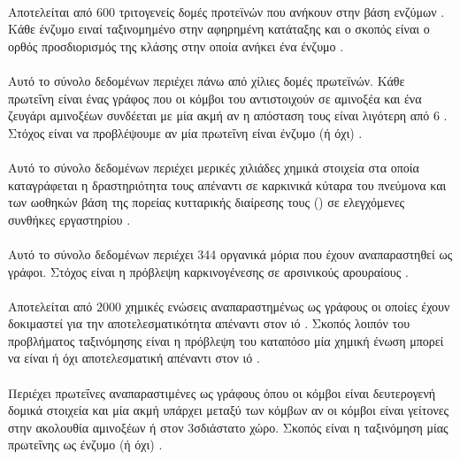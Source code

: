 \paragraph*{} Αποτελείται από $600$ τριτογενείς δομές προτεϊνών που ανήκουν στην βάση ενζύμων .
Κάθε ένζυμο ειναί ταξινομημένο στην αφηρημένη κατάταξης  και ο σκοπός είναι ο ορθός προσδιορισμός της κλάσης στην οποία ανήκει ένα ένζυμο \cite{Borgwardt2005}.

\paragraph*{} Αυτό το σύνολο δεδομένων περιέχει πάνω από χίλιες δομές πρωτεϊνών.
Κάθε πρωτεΐνη είναι ένας γράφος που οι κόμβοι του αντιστοιχούν σε αμινοξέα και ένα ζευγάρι αμινοξέων συνδέεται με μία ακμή αν η απόσταση τους είναι λιγότερη από 6 .
Στόχος είναι να προβλέψουμε αν μία πρωτεΐνη είναι ένζυμο (ή όχι) \cite{DobsonDoig03, shervashidze2011weisfeiler}.

\paragraph*{} Αυτό το σύνολο δεδομένων περιέχει μερικές χιλιάδες χημικά στοιχεία στα οποία καταγράφεται η δραστηριότητα τους απέναντι σε καρκινικά κύταρα του πνεύμονα και των ωοθηκών βάση της πορείας κυτταρικής διαίρεσης τους () σε ελεγχόμενες συνθήκες εργαστηρίου \cite{Wale2008}.

\paragraph*{} Αυτό το σύνολο δεδομένων περιέχει 344 οργανικά μόρια που έχουν αναπαραστηθεί ως γράφοι.
Στόχος είναι η πρόβλεψη καρκινογένεσης σε αρσινικούς αρουραίους \cite{Toivonen2003}.

\paragraph*{} Αποτελείται από $2000$ χημικές ενώσεις αναπαραστημένως ως γράφους οι οποίες έχουν δοκιμαστεί για την αποτελεσματικότητα απέναντι στον ιό . Σκοπός λοιπόν του προβλήματος ταξινόμησης είναι η πρόβλεψη του καταπόσο μία χημική ένωση μπορεί να είναι ή όχι αποτελεσματική απέναντι στον ιό \cite{Riesen08}.

\paragraph*{} Περιέχει πρωτεΐνες αναπαραστιμένες ως γράφους όπου οι κόμβοι είναι δευτερογενή δομικά στοιχεία και μία ακμή υπάρχει μεταξύ των κόμβων αν οι κόμβοι είναι γείτονες στην ακολουθία αμινοξέων ή στον 3σδιάστατο χώρο.
Σκοπός είναι η ταξινόμηση μίας πρωτεΐνης ως ένζυμο (ή όχι) \cite{borgwardt2005protein}.

